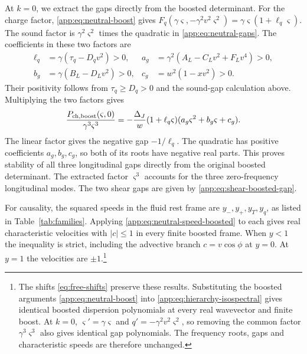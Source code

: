 At $k=0$, we extract the gaps directly from the boosted determinant.
For the charge factor, \eqref{app:eq:neutral-boost} gives
$F_q(\gamma\varsigma,-\gamma^2v^2\varsigma^2)
=\gamma\varsigma(1+\ell_q\varsigma)$.
The sound factor is $\gamma^2\varsigma^2$ times the quadratic
in \eqref{app:eq:neutral-gaps}. The coefficients in these two factors are
\begin{align}\label{app:eq:charged-gap-coefficients}
 \ell_q&=\gamma(\tau_q-D_qv^2)>0,&
 a_g&=\gamma^2(A_L-C_Lv^2+F_Lv^4)>0,\nonumber\\
 b_g&=\gamma(B_L-D_Lv^2)>0,&c_g&=w^2(1-xv^2)>0.
\end{align}
Their positivity follows from $\tau_q\geq D_q>0$ and the sound-gap
calculation above. Multiplying the two factors gives
\begin{equation}\label{app:eq:charged-uplift-gaps}
 \frac{P_{\rm ch,boost}(\varsigma,0)}{\gamma^3\varsigma^3}
 =-\frac{\Delta_J}{w}(1+\ell_q\varsigma)(a_g\varsigma^2+b_g\varsigma+c_g).
\end{equation}
The linear factor gives the negative gap $-1/\ell_q$.
The quadratic has positive coefficients $a_g,b_g,c_g$, so both of
its roots have negative real parts. This proves stability of all
three longitudinal gaps directly from the original boosted determinant.
The extracted factor $\varsigma^3$ accounts for the three zero-frequency
longitudinal modes. The two shear gaps are given by
\eqref{app:eq:shear-boosted-gap}.

For causality, the squared speeds in the fluid rest frame are
$y_-,y_+,y_T,y_q$, as listed in Table~\ref{tab:families}.
Applying \eqref{app:eq:neutral-speed-boosted} to each gives real
characteristic velocities with $|c|\leq1$ in every finite boosted frame.
When $y<1$ the inequality is strict, including the advective branch
$c=v\cos\phi$ at $y=0$. At $y=1$ the velocities are $\pm1$.\footnote{\label{fn:deformation-boosts}The shifts \eqref{eq:free-shifts} preserve these results. Substituting the boosted arguments \eqref{app:eq:neutral-boost} into \eqref{app:eq:hierarchy-isospectral} gives identical boosted dispersion polynomials at every real wavevector and finite boost. At $k=0$, $\varsigma'=\gamma\varsigma$ and $q'=-\gamma^2v^2\varsigma^2$, so removing the common factor $\gamma^3\varsigma^3$ also gives identical gap polynomials. The frequency roots, gaps and characteristic speeds are therefore unchanged.}

